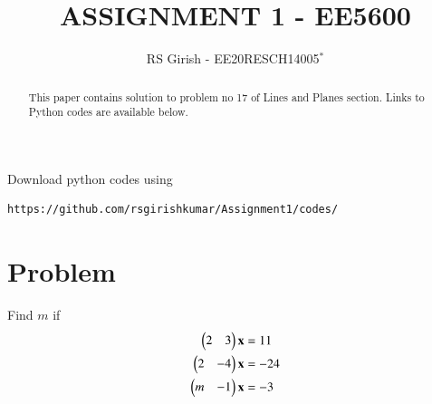 \documentclass[journal,12pt,twocolumn]{IEEEtran}
\begin{document}
\makeatletter
{}
\makeatother
\let\StandardTheFigure\thefigure
\let\vec\mathbf
\renewcommand{\thefigure}{\theproblem}
\def\putbox#1#2#3{\makebox[0in][l]{\makebox[#1][l]{}\raisebox{\baselineskip}[0in][0in]{\raisebox{#2}[0in][0in]{#3}}}}
     \def\rightbox#1{\makebox[0in][r]{#1}}
     \def\centbox#1{\makebox[0in]{#1}}
     \def\topbox#1{\raisebox{-\baselineskip}[0in][0in]{#1}}
     \def\midbox#1{\raisebox{-0.5\baselineskip}[0in][0in]{#1}}
\vspace{3cm}
\title{
ASSIGNMENT 1 - EE5600
	}
\author{ RS Girish - EE20RESCH14005$^{*}$%
	}	

\maketitle
\newpage
\tableofcontents
\bigskip
\renewcommand{\thefigure}{\theenumi}
\renewcommand{\thetable}{\theenumi}

\begin{abstract}
This paper contains solution to problem no 17 of Lines and Planes section.
Links to Python codes are available below.  
\end{abstract}
Download python codes using 
\begin{lstlisting}
https://github.com/rsgirishkumar/Assignment1/codes/
\end{lstlisting}
\section{Problem}
Find $m$ if 
\begin{align}
\begin{split}
\myvec{2 & 3 }\vec{x}&=11
\\
\myvec{2 & -4 }\vec{x}&=-24
\\
\myvec{m & -1 }\vec{x}&=-3
\\
\end{split}
\end{align}
\end{document}
